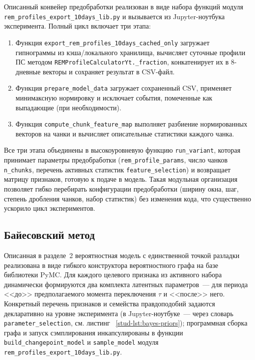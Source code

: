 \documentclass[14pt]{mmcs_article}
\begin{document}
Описанный конвейер предобработки реализован в виде набора
функций модуля \texttt{rem\_profiles\_export\_10days\_lib.py}
и вызывается из Jupyter-ноутбука эксперимента. Полный цикл
включает три этапа:

\begin{enumerate}
	\item Функция
	\texttt{export\_rem\_profiles\_10days\_cached\_only}
	загружает гипнограммы из кэша/локального хранилища,
	вычисляет суточные профили ПС методом
	\texttt{REMProfileCalculatorYt.\_fraction}, конкатенирует
	их в 8-дневные векторы и сохраняет результат в CSV-файл.
	\item Функция \texttt{prepare\_model\_data} загружает
	сохраненный CSV, применяет минимаксную нормировку и
	исключает события, помеченные как выпадающие (при
	необходимости).
	\item Функция \texttt{compute\_chunk\_feature\_map}
	выполняет разбиение нормированных векторов на чанки и
	вычисляет описательные статистики каждого чанка.
\end{enumerate}

Все три этапа объединены в высокоуровневую функцию
\texttt{run\_variant}, которая принимает параметры
предобработки (\texttt{rem\_profile\_params}, число чанков
\texttt{n\_chunks}, перечень активных статистик
\texttt{feature\_selection}) и возвращает матрицу признаков,
готовую к подаче в модель. Такая модульная организация
позволяет гибко перебирать конфигурации предобработки
(ширину окна, шаг, степень дробления чанков, набор статистик)
без изменения кода, что существенно ускорило цикл
экспериментов.

\subsection{Байесовский метод}

Описанная в разделе~2 вероятностная модель с единственной
точкой разладки реализована в виде гибкого конструктора
вероятностного графа на базе библиотеки PyMC. Для каждого
целевого признака из активного набора динамически
формируются два комплекта латентных параметров~--- для
периода <<до>> предполагаемого момента переключения $\tau$ и
<<после>> него. Конкретный перечень признаков и семейства
правдоподобий задаются декларативно на уровне эксперимента
(в Jupyter-ноутбуке~--- через словарь
\texttt{parameter\_selection}, см. листинг~%
\ref{stud-lst:bayes-priors}); программная сборка графа и
запуск сэмплирования инкапсулированы в функции
\texttt{build\_changepoint\_model} и \texttt{sample\_model}
модуля \texttt{rem\_profiles\_export\_10days\_lib.py}.
\end{document}
